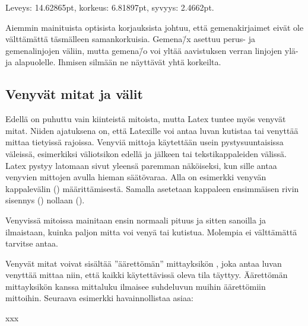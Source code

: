 \begin{tulossis}
  Leveys: 14.62865pt, korkeus: 6.81897pt, syvyys: 2.4662pt.
\end{tulossis}

\noindent
Aiemmin mainituista optisista korjauksista johtuu, että gemenakirjaimet
eivät ole välttämättä täsmälleen samankorkuisia. Gemena\=/x asettuu
perus- ja gemenalinjojen väliin, mutta gemena\=/o voi yltää aavistuksen
verran linjojen ylä- ja alapuolelle. Ihmisen silmään ne näyttävät yhtä
korkeilta.

\subsection{Venyvät mitat ja välit}
\label{luku/venyvät-mitat}

Edellä on puhuttu vain kiinteistä mitoista, mutta Latex tuntee myös
venyvät mitat. Niiden ajatuksena on, että Latexille voi antaa luvan
kutistaa tai venyttää mittaa tietyissä rajoissa. Venyviä mittoja
käytettään usein pystysuuntaisissa väleissä, esimerkiksi väliotsikon
edellä ja jälkeen tai tekstikappaleiden välissä. Latex pystyy latomaan
sivut yleensä paremman näköiseksi, kun sille antaa venyvien mittojen
avulla hieman säätövaraa. Alla on esimerkki venyvän kappalevälin
() määrittämisestä. Samalla asetetaan kappaleen
ensimmäisen rivin sisennys () nollaan (\koodi{0em}).

\begin{koodilohkosis}
\setlength{\parskip}{2ex plus 0.2ex minus 0.1ex}
\setlength{\parindent}{0em}
\end{koodilohkosis}

\noindent
Venyvissä mitoissa mainitaan ensin normaali pituus ja sitten sanoilla
 ja  ilmaistaan, kuinka paljon mitta voi venyä
tai kutistua. Molempia ei välttämättä tarvitse antaa.

Venyvät mitat voivat sisältää ''äärettömän'' mittayksikön ,
joka antaa luvan venyttää mittaa niin, että kaikki käytettävissä oleva
tila täyttyy. Äärettömän mittayksikön kanssa mittaluku ilmaisee
suhdeluvun muihin äärettömiin mittoihin. Seuraava esimerkki
havainnollistaa asiaa:

\begin{koodilohkosis}
x\hspace{0mm plus 1fill}x\hspace{0mm plus 2fill}x
\end{koodilohkosis}


